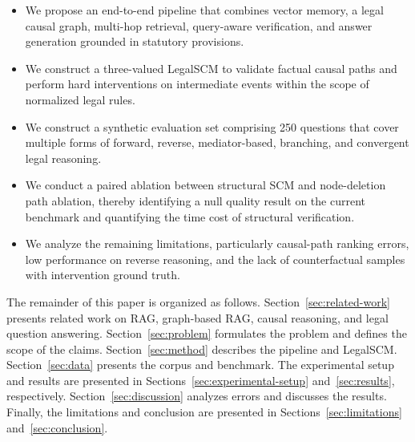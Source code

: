 \begin{itemize}
    \item We propose an end-to-end pipeline that combines vector memory, a
    legal causal graph, multi-hop retrieval, query-aware verification, and
    answer generation grounded in statutory provisions.

    \item We construct a three-valued LegalSCM to validate factual causal
    paths and perform hard interventions on intermediate events within the
    scope of normalized legal rules.

    \item We construct a synthetic evaluation set comprising 250 questions
    that cover multiple forms of forward, reverse, mediator-based,
    branching, and convergent legal reasoning.

    \item We conduct a paired ablation between structural SCM and
    node-deletion path ablation, thereby identifying a null quality result
    on the current benchmark and quantifying the time cost of structural
    verification.

    \item We analyze the remaining limitations, particularly causal-path
    ranking errors, low performance on reverse reasoning, and the lack of
    counterfactual samples with intervention ground truth.
\end{itemize}

The remainder of this paper is organized as follows.
Section~\ref{sec:related-work} presents related work on RAG, graph-based RAG,
causal reasoning, and legal question answering. Section~\ref{sec:problem}
formulates the problem and defines the scope of the claims.
Section~\ref{sec:method} describes the pipeline and LegalSCM.
Section~\ref{sec:data} presents the corpus and benchmark. The experimental
setup and results are presented in Sections~\ref{sec:experimental-setup}
and~\ref{sec:results}, respectively. Section~\ref{sec:discussion} analyzes
errors and discusses the results. Finally, the limitations and conclusion
are presented in Sections~\ref{sec:limitations} and~\ref{sec:conclusion}.
